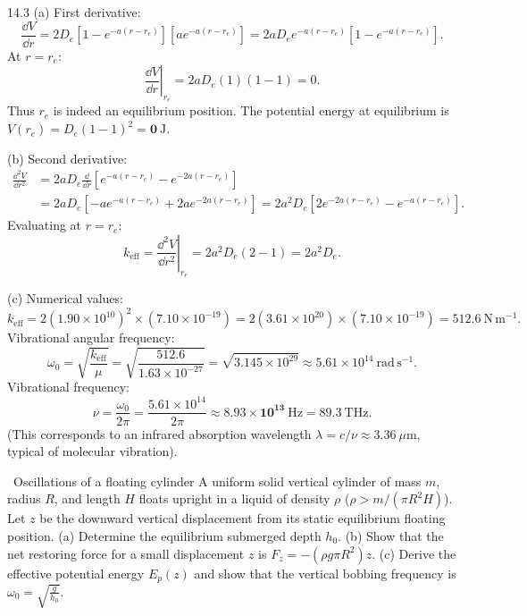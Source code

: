 \begin{tabletworkspace}[6.0cm]
\end{tabletworkspace}

\begin{solution}{14.3}
(a) First derivative:
\[
\frac{\dd V}{\dd r} = 2D_e\left[ 1 - e^{-a(r - r_e)} \right]\left[ a e^{-a(r - r_e)} \right] = 2a D_e e^{-a(r - r_e)}\left[ 1 - e^{-a(r - r_e)} \right].
\]
At $r = r_e$:
\[
\left.\frac{\dd V}{\dd r}\right|_{r_e} = 2a D_e(1)(1 - 1) = 0.
\]
Thus $r_e$ is indeed an equilibrium position.
The potential energy at equilibrium is $V(r_e) = D_e(1 - 1)^2 = \mathbf{0\ \mathrm{J}}$.

(b) Second derivative:
\begin{align*}
\frac{\dd^2 V}{\dd r^2} &= 2a D_e \frac{\dd}{\dd r}\left[ e^{-a(r - r_e)} - e^{-2a(r - r_e)} \right] \\
&= 2a D_e\left[ -a e^{-a(r - r_e)} + 2a e^{-2a(r - r_e)} \right] = 2a^2 D_e\left[ 2e^{-2a(r - r_e)} - e^{-a(r - r_e)} \right].
\end{align*}
Evaluating at $r = r_e$:
\[
k_{\text{eff}} = \left.\frac{\dd^2 V}{\dd r^2}\right|_{r_e} = 2a^2 D_e(2 - 1) = \boxed{2a^2 D_e.}
\]

(c) Numerical values:
\[
k_{\text{eff}} = 2(1.90\times 10^{10})^2\times(7.10\times 10^{-19}) = 2(3.61\times 10^{20})\times(7.10\times 10^{-19}) = \mathbf{512.6\ \mathrm{N\,m^{-1}}.}
\]
Vibrational angular frequency:
\[
\omega_0 = \sqrt{\frac{k_{\text{eff}}}{\mu}} = \sqrt{\frac{512.6}{1.63\times 10^{-27}}} = \sqrt{3.145\times 10^{29}} \approx 5.61\times 10^{14}\ \mathrm{rad\,s^{-1}}.
\]
Vibrational frequency:
\[
\nu = \frac{\omega_0}{2\pi} = \frac{5.61\times 10^{14}}{2\pi} \approx \mathbf{8.93\times 10^{13}\ \mathrm{Hz}} = 89.3\ \mathrm{THz}.
\]
(This corresponds to an infrared absorption wavelength $\lambda = c/\nu \approx 3.36\ \mu\mathrm{m}$, typical of molecular vibration).
\end{solution}

\begin{exercise}{\core\ Oscillations of a floating cylinder}
A uniform solid vertical cylinder of mass $m$, radius $R$, and length $H$ floats upright in a liquid of density $\rho$ ($\rho > m / (\pi R^2 H)$).
Let $z$ be the downward vertical displacement from its static equilibrium floating position.
(a) Determine the equilibrium submerged depth $h_0$.
(b) Show that the net restoring force for a small displacement $z$ is $F_z = -(\rho g \pi R^2)z$.
(c) Derive the effective potential energy $E_p(z)$ and show that the vertical bobbing frequency is $\omega_0 = \sqrt{\frac{g}{h_0}}$.
\end{exercise}

